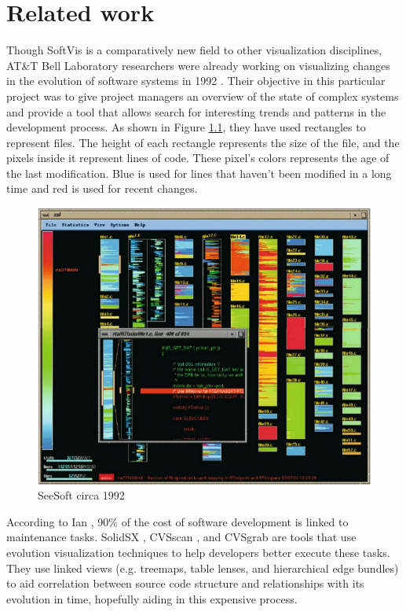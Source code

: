 \chapter{Related work} \label{sec:related}
Though SoftVis is a comparatively new field to other visualization disciplines, AT\&T Bell Laboratory researchers were already working on visualizing changes in the evolution of software systems in 1992 \cite{seesoft}. Their objective in this particular project was to give project managers an overview of the state of complex systems and provide a tool that allows search for interesting trends and patterns in the development process. As shown in Figure \ref{fig:seesoft}, they have used rectangles to represent files. The height of each rectangle represents the size of the file, and the pixels inside it represent lines of code. These pixel's colors represents the age of the last modification. Blue is used for lines that haven't been modified in a long time and red is used for recent changes.

\begin{figure}[H]
	\centering
	\includegraphics[width=1.0\textwidth]{figures/seesoft.png}
	\caption{SeeSoft circa 1992}
	\label{fig:seesoft}
\end{figure}

According to Ian \citet{Sommerville:2004:SE:983346}, 90\% of the cost of software development is linked to maintenance tasks. SolidSX \cite{ref:solid}, CVSscan \cite{voinea2005}, and CVSgrab \cite{VisSymEuroVis06} are tools that use evolution visualization techniques to help developers better execute these tasks. They use linked views (e.g. treemaps, table lenses, and hierarchical edge bundles) to aid correlation between source code structure and relationships with its evolution in time, hopefully aiding in this expensive process.

